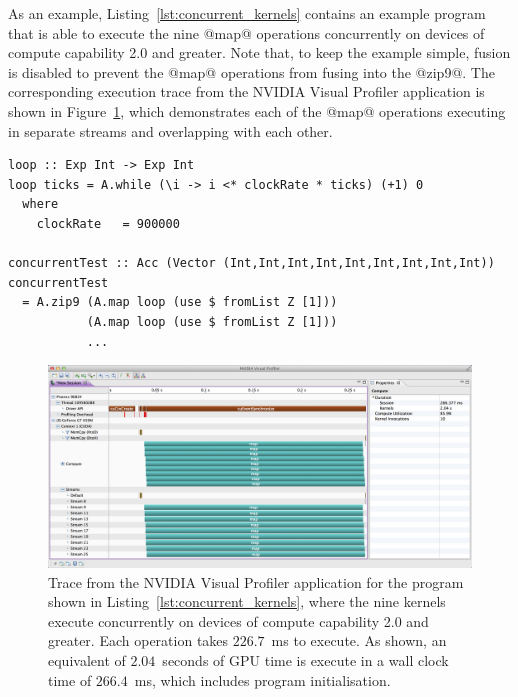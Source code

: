 As an example, Listing~\ref{lst:concurrent_kernels} contains an example program
that is able to execute the nine @map@ operations concurrently on devices of
compute capability 2.0 and greater. Note that, to keep the example simple,
fusion is disabled to prevent the @map@ operations from fusing into the @zip9@.
The corresponding execution trace from the NVIDIA Visual Profiler application is
shown in Figure~\ref{fig:concurrent_kernels}, which demonstrates each of the
@map@ operations executing in separate streams and overlapping with each other.

\begin{lstlisting}[style=haskell_float
    ,float
    ,label=lst:concurrent_kernels
    ,caption={[Example program that executes kernels concurrently]
        An example program that executes each of the \code{map} kernels
        concurrently, on devices of compute capability 2.0 and greater. Note
        that in order to keep the example simple, the displayed behaviour is
        only seen when fusion is disabled, to prevent the operations from being
        combined into a singel kernel.}]
loop :: Exp Int -> Exp Int
loop ticks = A.while (\i -> i <* clockRate * ticks) (+1) 0
  where
    clockRate   = 900000

concurrentTest :: Acc (Vector (Int,Int,Int,Int,Int,Int,Int,Int,Int))
concurrentTest
  = A.zip9 (A.map loop (use $ fromList Z [1]))
           (A.map loop (use $ fromList Z [1]))
           ...
\end{lstlisting}

\begin{figure}[tbp]
    \centering
    \includegraphics[width=\textwidth]{images/impl/concurrent_kernels}
    \caption[Profiling trace of a program which executes kernels
    concurrently]{Trace from the NVIDIA Visual Profiler application for the
    program shown in Listing~\ref{lst:concurrent_kernels}, where the nine
     kernels execute concurrently on devices of compute capability 2.0
    and greater. Each  operation takes $226.7$~ms to execute. As
    shown, an equivalent of $2.04$~seconds of GPU time is execute in a wall
    clock time of $266.4$~ms, which includes program initialisation.}
    \label{fig:concurrent_kernels}
\end{figure}

